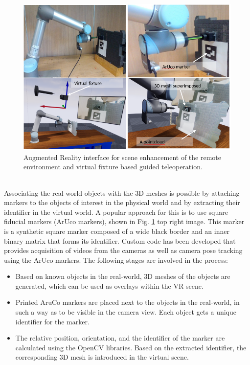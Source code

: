 \begin{figure}[h]
    \centering
    \includegraphics[scale=0.5]{images/Aruco_AR.PNG}
    \caption{Augmented Reality  interface  for  scene enhancement of the remote environment and virtual fixture based guided teleoperation.}
    \label{fig:Aruco_AR}
\end{figure}\\

Associating the real-world objects with the 3D meshes is possible by attaching markers to the objects of  interest  in  the  physical  world  and  by  extracting  their  identifier  in  the virtual  world.  A  popular  approach  for  this  is  to  use  square  fiducial  markers  (ArUco  markers),  shown  in  Fig. \ref{fig:Aruco_AR} top right  image.  This  marker is a synthetic square marker composed of a wide black border and an inner binary matrix that forms its identifier. Custom code has been developed that provides acquisition of videos from the cameras as well as camera pose tracking using the ArUco markers. The following stages are involved in the process:

\begin{itemize}
    \item Based on known objects in the real-world, 3D meshes of the objects are generated, which can be used as overlays within the VR scene. 
    \item Printed AruCo markers are placed next to the objects in the real-world, in such a way as to be visible in the camera view. Each object gets a unique identifier for the marker.
    \item The  relative  position,  orientation,  and  the  identifier  of  the  marker  are  calculated  using  the  OpenCV libraries. Based on the extracted identifier, the corresponding 3D mesh is introduced in the virtual scene. 
\end{itemize}


